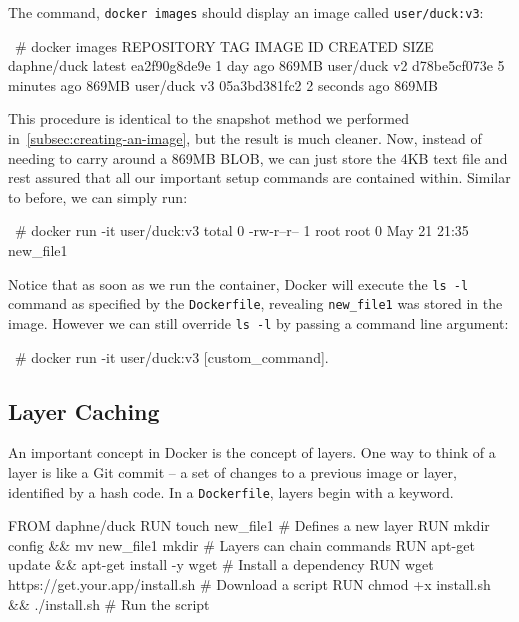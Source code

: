 \documentclass[12pt,initial,twoside,maitrise]{dms}
\def\inline{\lstinline[basicstyle=\ttfamily]}
\numberwithin{equation}{section}
\numberwithin{table}{chapter}
\numberwithin{figure}{chapter}
\begin{document}
The command, \inline{docker images} should display an image called \inline{user/duck:v3}:

\begin{pclisting}
~# docker images
REPOSITORY    TAG        IMAGE ID         CREATED          SIZE
daphne/duck   latest     ea2f90g8de9e     1 day ago        869MB
user/duck     v2         d78be5cf073e     5 minutes ago    869MB
user/duck     v3         05a3bd381fc2     2 seconds ago    869MB
\end{pclisting}

This procedure is identical to the snapshot method we performed in~\ref{subsec:creating-an-image}, but the result is much cleaner. Now, instead of needing to carry around a 869MB BLOB, we can just store the 4KB text file and rest assured that all our important setup commands are contained within. Similar to before, we can simply run:

\begin{pclisting}
~# docker run -it user/duck:v3
total 0
-rw-r--r-- 1 root root 0 May 21 21:35 new_file1
\end{pclisting}

Notice that as soon as we run the container, Docker will execute the \inline{ls -l} command as specified by the \inline{Dockerfile}, revealing \inline{new_file1} was stored in the image. However we can still override \inline{ls -l} by passing a command line argument:

\begin{pclisting}
~# docker run -it user/duck:v3 [custom_command].
\end{pclisting}

\subsection{Layer Caching}

An important concept in Docker is the concept of layers. One way to think of a layer is like a Git commit -- a set of changes to a previous image or layer, identified by a hash code. In a \inline{Dockerfile}, layers begin with a keyword.

\begin{filelisting}
FROM daphne/duck
RUN touch new_file1                             # Defines a new layer
RUN mkdir config && mv new_file1 mkdir          # Layers can chain commands
RUN apt-get update && apt-get install -y wget   # Install a dependency
RUN wget https://get.your.app/install.sh        # Download a script
RUN chmod +x install.sh && ./install.sh         # Run the script
\end{filelisting}
\end{document}

